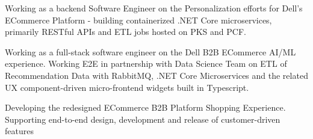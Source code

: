 \documentclass[10pt,a4paper,ragged2e,withhyper]{altacv}
\begin{document}
\begin{paracol}{2}


Working as a backend Software Engineer on the
Personalization efforts for Dell's ECommerce Platform -
building containerized .NET Core microservices, primarily
RESTful APIs and ETL jobs hosted on PKS and PCF.
\smallskip \newline



\divider


Working as a full-stack software engineer on the Dell B2B
ECommerce AI/ML experience. Working E2E in partnership with Data
Science Team on ETL of Recommendation Data with RabbitMQ, .NET Core Microservices and the related UX
component-driven micro-frontend widgets built in Typescript.
\smallskip \newline



\divider


Developing the redesigned ECommerce B2B Platform
Shopping Experience. Supporting end-to-end design,
development and release of customer-driven features
\smallskip \newline



\end{paracol}
\end{document}
